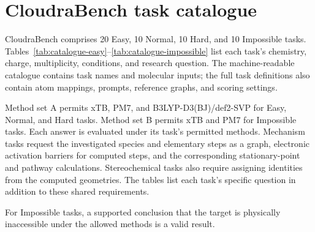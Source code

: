 \section{CloudraBench task catalogue}
\label{sec:task-catalogue}

CloudraBench comprises 20 Easy, 10 Normal, 10 Hard, and 10 Impossible tasks. Tables~\ref{tab:catalogue-easy}--\ref{tab:catalogue-impossible} list each task's chemistry, charge, multiplicity, conditions, and research question. The machine-readable catalogue contains task names and molecular inputs; the full task definitions also contain atom mappings, prompts, reference graphs, and scoring settings.

Method set A permits xTB, PM7, and B3LYP-D3(BJ)/def2-SVP for Easy, Normal, and Hard tasks. Method set B permits xTB and PM7 for Impossible tasks. Each answer is evaluated under its task's permitted methods. Mechanism tasks request the investigated species and elementary steps as a graph, electronic activation barriers for computed steps, and the corresponding stationary-point and pathway calculations. Stereochemical tasks also require assigning identities from the computed geometries. The tables list each task's specific question in addition to these shared requirements.

For Impossible tasks, a supported conclusion that the target is physically inaccessible under the allowed methods is a valid result.





